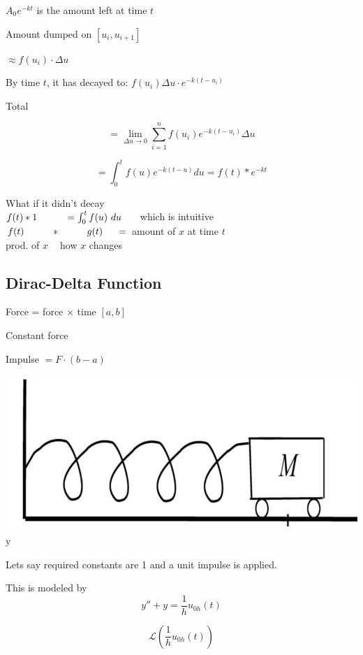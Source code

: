 \documentclass[12pt]{article}
\numberwithin{equation}{subsection}
\newcommand{\lap}{\mathscr{L}}
\newcommand{\inda}{\hspace{.5cm}}
\newcommand{\indb}{\hspace{1cm}}
\newcommand{\indc}{\hspace{1.5cm}}
\newcommand{\indm}{\hspace{6.5cm}}
\newcommand{\indn}{\hspace{7cm}}
\begin{document}
$A_0 e^{-kt}$ is the amount left at time $t$

\indm Amount dumped on $[u_i, u_{i+1}]$

\indn $\approx f(u_i)\cdot \Delta u$

By time $t$, it has decayed to: $f(u_i) \Delta u \cdot e^{-k(t-u_i)}$

\indb Total

$$= \lim_{\Delta u \rightarrow 0} \sum_{i=1}^{n} f(u_i)e^{-k(t-u_i)} \Delta u  $$

$$= \int_0^t f(u)e^{-k(t-u)} du  = f(t)*e^{-kt}$$

What if it didn't decay\\

$f(t)*1 \indb =\int_0^t f(u) \ du \inda $ which is intuitive\\

$f(t)\indb * \indb g(t) \inda =$ amount of $x$ at time $t$\\

prod. of $x \ \ \ \ $ how $x$ changes

\newpage
\subsection{Dirac-Delta Function}

\inda Force = force $\times $ time $[a,b]$

Constant force

\indc Impulse $= F \cdot (b-a)$

\includegraphics[scale=.25 ]{spring} y

Lets say required constants are 1 and a unit impulse is applied.

This is modeled by 
\begin{equation}
y''+y=\frac{1}{h}u_{0h}(t)
\end{equation}

\begin{equation}
\lap\left( \frac{1}{h}u_{0h}(t)\right)
\end{equation}
\end{document}
